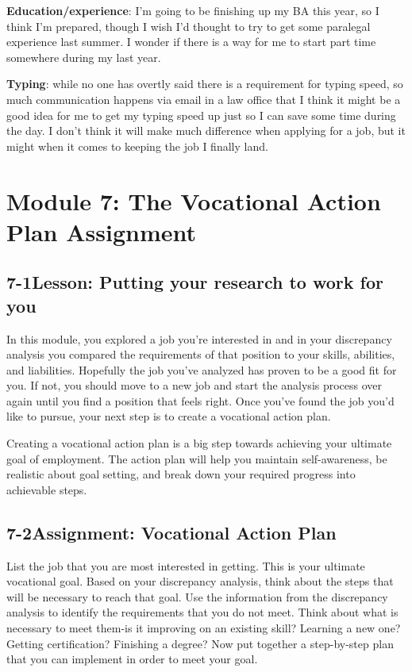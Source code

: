 \textbf{Education/experience}: I'm going to be finishing up my BA this year, so I think I'm prepared, though I wish I'd thought to try to get some paralegal experience last summer. I wonder if there is a way for me to start part time somewhere during my last year.

\textbf{Typing}: while no one has overtly said there is a requirement for typing speed, so much communication happens via email in a law office that I think it might be a good idea for me to get my typing speed up just so I can save some time during the day. I don't think it will make much difference when applying for a job, but it might when it comes to keeping the job I finally land.
 
 
\pagebreak \section*{Module 7:	The Vocational Action Plan Assignment}
\noindent\makebox[\textwidth]{\rule{\linewidth}{0.4pt}} 
\localtableofcontents 
\noindent\makebox[\textwidth]{\rule{\linewidth}{0.4pt}} 


\pagebreak \subsection*{7-1\quad Lesson: Putting your research to work for you}
In this module, you explored a job you're interested in and in your discrepancy analysis you compared the requirements of that position to your skills, abilities, and liabilities. Hopefully the job you've analyzed has proven to be a good fit for you. If not, you should move to a new job and start the analysis process over again until you find a position that feels right. Once you've found the job you'd like to pursue, your next step is to create a vocational action plan.

Creating a vocational action plan is a big step towards achieving your ultimate goal of employment. The action plan will help you maintain self-awareness, be realistic about goal setting, and break down your required progress into achievable steps.

\pagebreak \subsection*{7-2\quad Assignment: Vocational Action Plan}
List the job that you are most interested in getting. This is your ultimate vocational goal. Based on your discrepancy analysis, think about the steps that will be necessary to reach that goal. Use the information from the discrepancy analysis to identify the requirements that you do not meet. Think about what is necessary to meet them-is it improving on an existing skill? Learning a new one? Getting certification? Finishing a degree? Now put together a step-by-step plan that you can implement in order to meet your goal.

